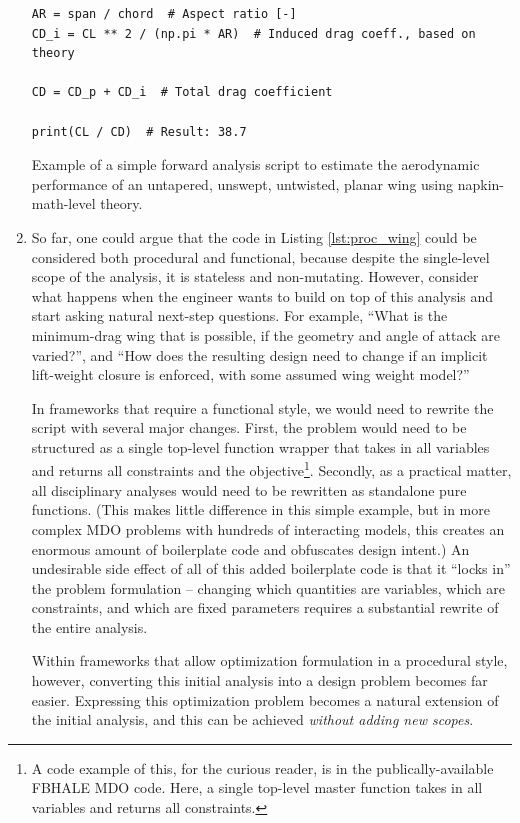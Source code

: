 \begin{enumerate}
\begin{listing}[H]
\begin{verbatim}
AR = span / chord  # Aspect ratio [-]
CD_i = CL ** 2 / (np.pi * AR)  # Induced drag coeff., based on theory

CD = CD_p + CD_i  # Total drag coefficient

print(CL / CD)  # Result: 38.7
        \end{verbatim}
        \caption{Example of a simple forward analysis script to estimate the aerodynamic performance of an untapered, unswept, untwisted, planar wing using napkin-math-level theory.}
        \label{lst:proc_wing}
    \end{listing}

    \item So far, one could argue that the code in Listing \ref{lst:proc_wing} could be considered both procedural and functional, because despite the single-level scope of the analysis, it is stateless and non-mutating. However, consider what happens when the engineer wants to build on top of this analysis and start asking natural next-step questions. For example, ``What is the minimum-drag wing that is possible, if the geometry and angle of attack are varied?'', and ``How does the resulting design need to change if an implicit lift-weight closure is enforced, with some assumed wing weight model?''

    In frameworks that require a functional style, we would need to rewrite the script with several major changes. First, the problem would need to be structured as a single top-level function wrapper that takes in all variables and returns all constraints and the objective\footnote{A code example of this, for the curious reader, is in the publically-available FBHALE MDO code. Here, a single top-level master function takes in all variables and returns all constraints.}. Secondly, as a practical matter, all disciplinary analyses would need to be rewritten as standalone pure functions. (This makes little difference in this simple example, but in more complex MDO problems with hundreds of interacting models, this creates an enormous amount of boilerplate code and obfuscates design intent.) An undesirable side effect of all of this added boilerplate code is that it ``locks in'' the problem formulation -- changing which quantities are variables, which are constraints, and which are fixed parameters requires a substantial rewrite of the entire analysis.

    Within frameworks that allow optimization formulation in a procedural style, however, converting this initial analysis into a design problem becomes far easier. Expressing this optimization problem becomes a natural extension of the initial analysis, and this can be achieved \emph{without adding new scopes}.


\end{enumerate}
